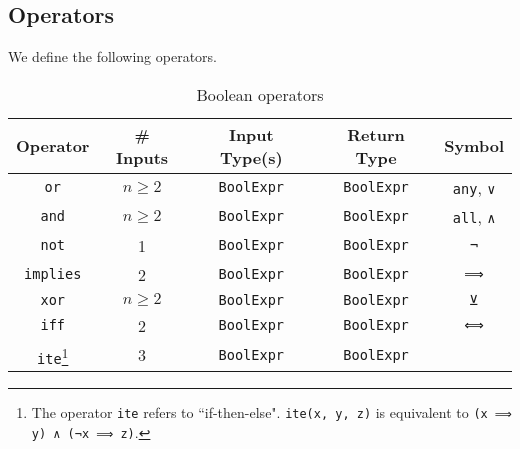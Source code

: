 \documentclass[conference]{IEEEtran}
\begin{document}
\subsection{Operators}
We define the following operators.
\begin{table}[h!]
	\centering
	\begin{tabular}{|c|c|c|c|c|}
	\hline
	Operator & \# Inputs & Input Type(s) & Return Type & Symbol\\
	\hline
	\verb|or| & $n\geq 2$ & \verb|BoolExpr| & \verb|BoolExpr| & \verb|any|, \verb|∨|\\
	\hline
	\verb|and| & $n\geq 2$ & \verb|BoolExpr| & \verb|BoolExpr| & \verb|all|, \verb|∧|\\
	\hline
	\verb|not| & 1 & \verb|BoolExpr| & \verb|BoolExpr| & \verb|¬|\\
	\hline
	\verb|implies| & 2 & \verb|BoolExpr| & \verb|BoolExpr| & \verb|⟹|\\
	\hline
	\verb|xor| & $n\geq 2$ & \verb|BoolExpr| & \verb|BoolExpr| & \verb|⊻|\\
	\hline
	\verb|iff| & 2 & \verb|BoolExpr| & \verb|BoolExpr| & \verb|⟺|\\
	\hline
	\verb|ite|\footnote{The operator \texttt{ite} refers to ``if-then-else". \texttt{ite(x, y, z)} is equivalent to \texttt{(x ⟹ y) ∧ (¬x ⟹ z)}.}
	& 3 & \verb|BoolExpr| & \verb|BoolExpr| & ~\\
	\hline
	\end{tabular}
\label{tab:bool_ops}
\caption{Boolean operators}
\end{table}
\end{document}
